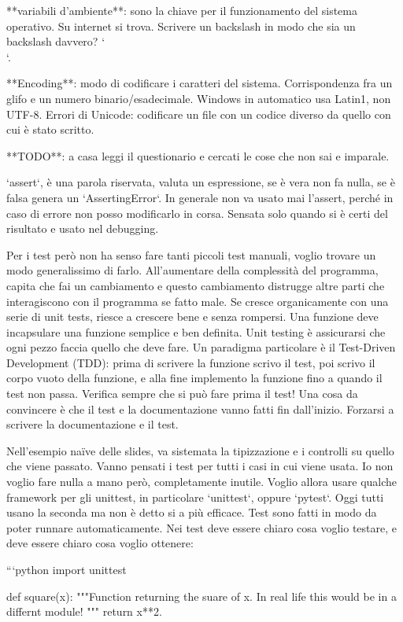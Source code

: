 \documentclass[10pt, a4paper, twosided, titlepage, draft]{book}
\begin{document}
**variabili d'ambiente**: sono la chiave per il funzionamento del sistema operativo. Su internet si trova. Scrivere un backslash in modo che sia un backslash davvero? `\\`.

**Encoding**: modo di codificare i caratteri del sistema. Corrispondenza fra un glifo e un numero binario/esadecimale. Windows in automatico usa Latin1, non UTF-8. Errori di Unicode: codificare un file con un codice diverso da quello con cui è stato scritto.

**TODO**: a casa leggi il questionario e cercati le cose che non sai e imparale.

`assert`, è una parola riservata, valuta un espressione, se è vera non fa nulla, se è falsa genera un `AssertingError`. In generale non va usato mai l'assert, perché in caso di errore non posso modificarlo in corsa. Sensata solo quando si è certi del risultato e usato nel debugging.

Per i test però non ha senso fare tanti piccoli test manuali, voglio trovare un modo generalissimo di farlo. All'aumentare della complessità del programma, capita che fai un cambiamento e questo cambiamento distrugge altre parti che interagiscono con il programma se fatto male.
Se cresce organicamente con una serie di unit tests, riesce a crescere bene e senza rompersi.
Una funzione deve incapsulare una funzione semplice e ben definita. Unit testing è assicurarsi che ogni pezzo faccia quello che deve fare.
Un paradigma particolare è il Test-Driven Development (TDD): prima di scrivere la funzione scrivo il test, poi scrivo il corpo vuoto della funzione, e alla fine implemento la funzione fino a quando il test non passa. Verifica sempre che si può fare prima il test!
Una cosa da convincere è che il test e la documentazione vanno fatti fin dall'inizio.
Forzarsi a scrivere la documentazione e il test.

Nell'esempio naïve delle slides, va sistemata la tipizzazione e i controlli su quello che viene passato. Vanno pensati i test per tutti i casi in cui viene usata.
Io non voglio fare nulla a mano però, completamente inutile. Voglio allora usare qualche framework per gli unittest, in particolare `unittest`, oppure `pytest`. Oggi tutti usano la seconda ma non è detto si a più efficace.
Test sono fatti in modo da poter runnare automaticamente. Nei test deve essere chiaro cosa voglio testare, e deve essere chiaro cosa voglio ottenere:

```python
import unittest

def square(x):
"""Function returning the suare of x.
In real life this would be in a differnt module!
"""
return x**2.
\end{document}
